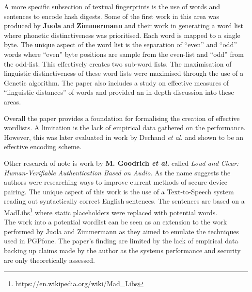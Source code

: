 A more specific subsection of textual fingerprints is the use of words and sentences to encode hash digests. Some of the first work in this area was produced by \textbf{Juola} and \textbf{Zimmermann}
\cite{juola1996whole} and their work in generating a word list where phonetic distinctiveness was prioritised. Each word is mapped to a single byte. The unique aspect of the word list is the separation of ``even'' and ``odd'' words where ``even'' byte positions are sample from the even-list and ``odd'' from the odd-list. This effectively creates two sub-word lists. The maximisation of linguistic distinctiveness of these word lists were maximised through the use of a Genetic algorithm. The paper also includes a study on effective measures of ``linguistic distances'' of words and provided an in-depth discussion into these areas.

Overall the paper provides a foundation for formalising the creation of effective wordlists. A limitation is the lack of empirical data gathered on the performance. However, this was later evaluated in work by Dechand \textit{et al.} \cite{dechand2016empirical} and shown to be an effective encoding scheme.

Other research of note is work by \textbf{M. Goodrich \textit{et al.}}\cite{goodrich2006loud} called \textit{Loud and Clear: Human-Verifiable Authentication Based on Audio}. As the name suggests the authors were researching ways to improve current methods of secure device pairing. The unique aspect of this work is the use of a Text-to-Speech system reading out syntactically correct English sentences. The sentences are based on a MadLibs\footnote{https://en.wikipedia.org/wiki/Mad\_Libs} where static placeholders were replaced with potential words.\\
The work into a potential wordlist can be seen as an extension to the work performed by Juola and Zimmermann\cite{juola1996whole} as they aimed to emulate the techniques used in PGPfone. The paper's finding are limited by the lack of empirical data backing up claims made by the author as the systems performance and security are only theoretically assessed.

